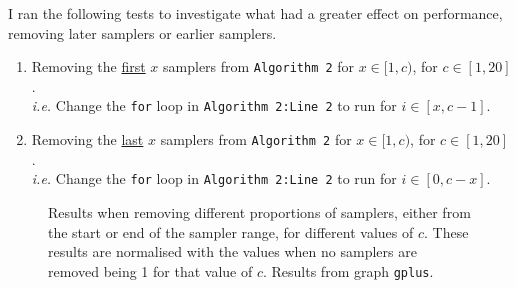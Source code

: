 \documentclass[11pt,twoside,a4paper]{report}
\begin{document}
\par I ran the following tests to investigate what had a greater effect on performance, removing later samplers or earlier samplers.
\begin{enumerate}
	\item Removing the \underline{first} $x$ samplers from \texttt{Algorithm 2} for $x\in[1,c)$, for $c\in[1,20]$.\\
	\textit{i.e.} Change the \texttt{for} loop in \texttt{Algorithm 2:Line 2} to run for $i\in[x,c-1]$.
	\item Removing the \underline{last} $x$ samplers from \texttt{Algorithm 2} for $x\in[1,c)$, for $c\in[1,20]$.\\
	\textit{i.e.} Change the \texttt{for} loop in \texttt{Algorithm 2:Line 2} to run for $i\in[0,c-x]$.
\end{enumerate}

\begin{figure}[H]
	\label{Figure 5}
	\caption{Results when removing different proportions of samplers, either from the start or end of the sampler range, for different values of $c$. These results are normalised with the values when no samplers are removed being 1 for that value of $c$. Results from graph \texttt{gplus}.}
\end{figure}
\end{document}
